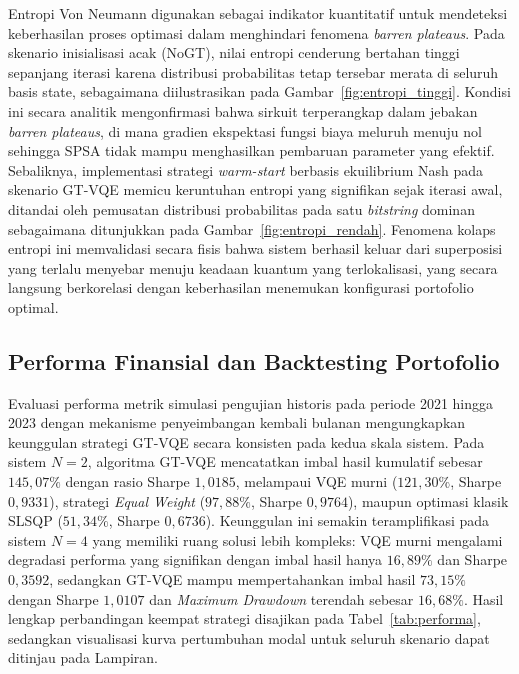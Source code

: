 Entropi Von Neumann digunakan sebagai indikator kuantitatif untuk mendeteksi keberhasilan proses optimasi dalam menghindari fenomena \textit{barren plateaus}. Pada skenario inisialisasi acak (NoGT), nilai entropi cenderung bertahan tinggi sepanjang iterasi karena distribusi probabilitas tetap tersebar merata di seluruh basis state, sebagaimana diilustrasikan pada Gambar~\ref{fig:entropi_tinggi}. Kondisi ini secara analitik mengonfirmasi bahwa sirkuit terperangkap dalam jebakan \textit{barren plateaus}, di mana gradien ekspektasi fungsi biaya meluruh menuju nol sehingga SPSA tidak mampu menghasilkan pembaruan parameter yang efektif. Sebaliknya, implementasi strategi \textit{warm-start} berbasis ekuilibrium Nash pada skenario GT-VQE memicu keruntuhan entropi yang signifikan sejak iterasi awal, ditandai oleh pemusatan distribusi probabilitas pada satu \textit{bitstring} dominan sebagaimana ditunjukkan pada Gambar~\ref{fig:entropi_rendah}. Fenomena kolaps entropi ini memvalidasi secara fisis bahwa sistem berhasil keluar dari superposisi yang terlalu menyebar menuju keadaan kuantum yang terlokalisasi, yang secara langsung berkorelasi dengan keberhasilan menemukan konfigurasi portofolio optimal.

\subsection{Performa Finansial dan Backtesting Portofolio}

Evaluasi performa metrik simulasi pengujian historis pada periode 2021 hingga 2023 dengan mekanisme penyeimbangan kembali bulanan mengungkapkan keunggulan strategi GT-VQE secara konsisten pada kedua skala sistem. Pada sistem $N=2$, algoritma GT-VQE mencatatkan imbal hasil kumulatif sebesar $145{,}07\%$ dengan rasio Sharpe $1{,}0185$, melampaui VQE murni ($121{,}30\%$, Sharpe $0{,}9331$), strategi \textit{Equal Weight} ($97{,}88\%$, Sharpe $0{,}9764$), maupun optimasi klasik SLSQP ($51{,}34\%$, Sharpe $0{,}6736$). Keunggulan ini semakin teramplifikasi pada sistem $N=4$ yang memiliki ruang solusi lebih kompleks: VQE murni mengalami degradasi performa yang signifikan dengan imbal hasil hanya $16{,}89\%$ dan Sharpe $0{,}3592$, sedangkan GT-VQE mampu mempertahankan imbal hasil $73{,}15\%$ dengan Sharpe $1{,}0107$ dan \textit{Maximum Drawdown} terendah sebesar $16{,}68\%$. Hasil lengkap perbandingan keempat strategi disajikan pada Tabel~\ref{tab:performa}, sedangkan visualisasi kurva pertumbuhan modal untuk seluruh skenario dapat ditinjau pada Lampiran.

